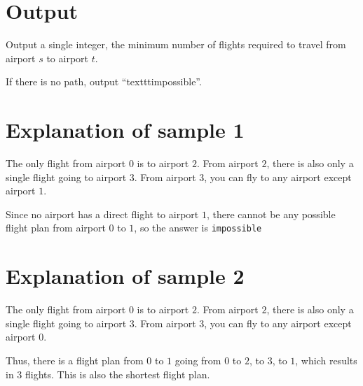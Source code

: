 \section*{Output}
Output a single integer, the minimum number of flights required to travel from airport $s$ to airport $t$.

If there is no path, output ``texttt{impossible}''.

\section*{Explanation of sample 1}
The only flight from airport $0$ is to airport $2$.
From airport $2$, there is also only a single flight going to airport $3$.
From airport $3$, you can fly to any airport except airport $1$.

Since no airport has a direct flight to airport $1$, there cannot be any possible flight plan from airport $0$ to $1$, so the answer is \texttt{impossible}

\section*{Explanation of sample 2}
The only flight from airport $0$ is to airport $2$.
From airport $2$, there is also only a single flight going to airport $3$.
From airport $3$, you can fly to any airport except airport $0$.

Thus, there is a flight plan from $0$ to $1$ going from $0$ to $2$, to $3$, to $1$, which results in 3 flights.
This is also the shortest flight plan.
